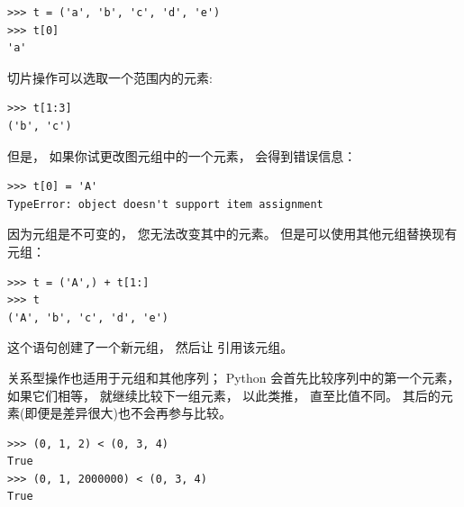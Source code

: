 \begin{lstlisting}
>>> t = ('a', 'b', 'c', 'd', 'e')
>>> t[0]
'a'
\end{lstlisting}
%

切片操作可以选取一个范围内的元素:
  
  
  
  

\begin{lstlisting}
>>> t[1:3]
('b', 'c')
\end{lstlisting}
%

但是， 如果你试更改图元组中的一个元素， 会得到错误信息：

  
  

\begin{lstlisting}
>>> t[0] = 'A'
TypeError: object doesn't support item assignment
\end{lstlisting}

%

因为元组是不可变的， 您无法改变其中的元素。
但是可以使用其他元组替换现有元组：

\begin{lstlisting}
>>> t = ('A',) + t[1:]
>>> t
('A', 'b', 'c', 'd', 'e')
\end{lstlisting}
%

这个语句创建了一个新元组， 然后让  引用该元组。


关系型操作也适用于元组和其他序列；
Python 会首先比较序列中的第一个元素， 如果它们相等， 就继续比较下一组元素，
以此类推， 直至比值不同。
其后的元素(即便是差异很大)也不会再参与比较。


\begin{lstlisting}
>>> (0, 1, 2) < (0, 3, 4)
True
>>> (0, 1, 2000000) < (0, 3, 4)
True
\end{lstlisting}


